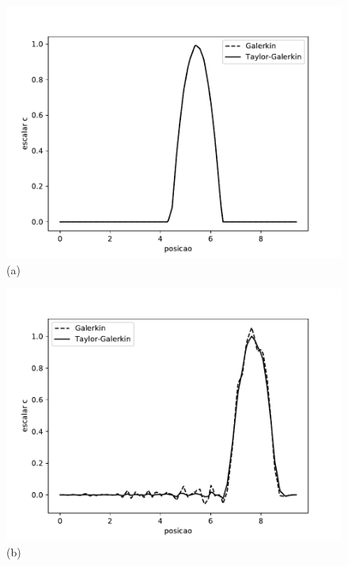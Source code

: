 \begin{center}
\begin{figure}[H]
     \centering
     \begin{minipage}{.5\linewidth}
      \centering
      \includegraphics[scale=0.53]{./02_chaps/cap_validation/figure/convection_0.pdf}\\
      (a)
     \end{minipage}%
     \begin{minipage}{.5\linewidth}
      \centering
      \includegraphics[scale=0.53]{./02_chaps/cap_validation/figure/convection_300.pdf}\\
      (b)
     \end{minipage}
     \begin{minipage}{.5\linewidth}

\end{minipage}
\end{figure}
\end{center}
